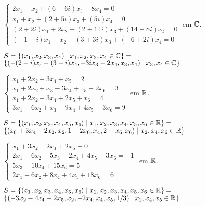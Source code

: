\documentclass[12pt]{exam}
\begin{document}
\begin{exercicio}
    $
        \begin{cases}
            2x_1 + x_2 + (6 + 6i)x_3 + 8x_4 = 0\\
            x_1 + x_2 + (2 + 5i)x_3 + (5  i)x_4 = 0\\
            (2 + 2i)x_1 + 2x_2 + (2 + 14i)x_3 + (14 + 8i)x_4 =0\\
            (-1 - i)x_1 - x_2 - (3 + 3i)x_3 + (-6 + 2i)x_4 = 0
        \end{cases}
    $
    em $\mathbb{C}$.
    \begin{solucao}
        $S = \{(x_1, x_2, x_3, x_4) \mid x_1, x_2, x_3, x_4 \in \mathbb{C}\} = $\\ $\{(-(2 + i)x_3 - (3 - i)x_4,-3ix_3 - 2x_4, x_3, x_4) \mid x_3, x_4 \in \mathbb{C}\}$
    \end{solucao}
\end{exercicio}

\begin{exercicio}
    $
        \begin{cases}
            x_1 + 2x_2 - 3x_4 + x_5 = 2\\
            x_1 + 2x_2 + x_3 - 3x_4 + x_5 + 2x_6 = 3\\
            x_1 + 2x_2 - 3x_4 + 2x_5 + x_6 = 4\\
            3x_1 + 6x_2 + x_3 - 9x_4 + 4x_5 + 3x_6 = 9
        \end{cases}
    $
    em $\mathbb{R}$.
    \begin{solucao}
        $S = \{(x_1, x_2, x_3, x_4, x_5, x_6) \mid x_1, x_2, x_3, x_4, x_5, x_6 \in \mathbb{R}\} = $\\ $\{(x_6 + 3x_4 - 2x_2, x_2, 1 - 2x_6, x_4, 2 - x_6, x_6) \mid x_2, x_4, x_6 \in \mathbb{R}\}$
    \end{solucao}
\end{exercicio}

\begin{exercicio}
    $
        \begin{cases}
            x_1 + 3x_2 - 2x_3 + 2x_5 = 0\\
            2x_1 + 6x_2 - 5x_3 - 2x_4 + 4x_5 - 3x_6 = -1\\
            5x_3 + 10x_4 + 15x_6 = 5\\
            2x_1 + 6x_2 + 8x_4 + 4x_5 + 18x_6 = 6
        \end{cases}
    $
    em $\mathbb{R}$.
    \begin{solucao}
        $S = \{(x_1, x_2, x_3, x_4, x_5, x_6) \mid x_1, x_2, x_3, x_4, x_5, x_6 \in \mathbb{R}\} = $\\ $\{(-3x_2 - 4x_4 - 2x_5, x_2, -2x_4, x_4, x_5, 1/3) \mid x_2, x_4, x_5 \in \mathbb{R}\}$
    \end{solucao}
\end{exercicio}
\end{document}
